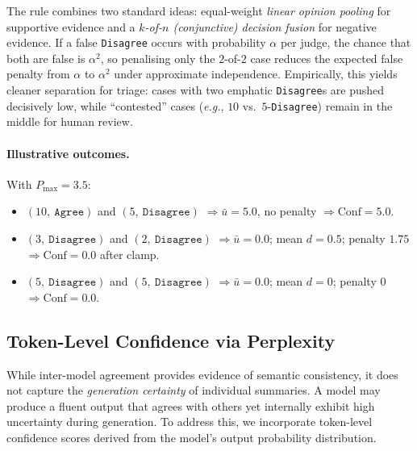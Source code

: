 The rule combines two standard ideas: equal-weight \emph{linear opinion
pooling} for supportive evidence and a \emph{$k$-of-$n$ (conjunctive)
decision fusion} for negative evidence. If a false \texttt{Disagree}
occurs with probability $\alpha$ per judge, the chance that both are
false is $\alpha^2$, so penalising only the $2$-of-$2$ case reduces the
expected false penalty from $\alpha$ to $\alpha^2$ under approximate
independence. Empirically, this yields cleaner separation for triage:
cases with two emphatic \texttt{Disagree}s are pushed decisively low,
while “contested” cases (\emph{e.g.}, $10$ vs.\ $5$-\texttt{Disagree})
remain in the middle for human review.

\paragraph{Illustrative outcomes.} With $P_{\max}=3.5$:
\begin{itemize}[nosep]
  \item $(10,\ \texttt{Agree})$ and $(5,\ \texttt{Disagree})$
        $\Rightarrow \bar{u}=5.0$, no penalty $\Rightarrow \text{Conf}=5.0$.
  \item $(3,\ \texttt{Disagree})$ and $(2,\ \texttt{Disagree})$
        $\Rightarrow \bar{u}=0.0$; mean $d=0.5$; penalty $1.75$
        $\Rightarrow \text{Conf}=0.0$ after clamp.
  \item $(5,\ \texttt{Disagree})$ and $(5,\ \texttt{Disagree})$
        $\Rightarrow \bar{u}=0.0$; mean $d=0$; penalty $0$
        $\Rightarrow \text{Conf}=0.0$.
\end{itemize}


\subsection{Token-Level Confidence via Perplexity}
\label{sec:perplexity}

While inter-model agreement provides evidence of semantic consistency, it does not capture
the \emph{generation certainty} of individual summaries. A model may produce a fluent
output that agrees with others yet internally exhibit high uncertainty during generation.
To address this, we incorporate token-level confidence scores derived from the model's
output probability distribution.

